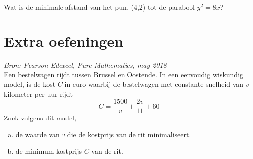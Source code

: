 \documentclass[a4paper,12pt,twoside]{article}
\begin{document}
\begin{oefening}
  Wat is de minimale afstand van het punt (4,2) tot de parabool $y^2 = 8x$?
\end{oefening}


\pagebreak
\section{Extra oefeningen}

\begin{oefening}{\em Bron: Pearson Edexcel, Pure Mathematics, may 2018}\\
  Een bestelwagen rijdt tussen Brussel en Oostende. In een eenvoudig wiskundig model, is de kost $C$ in euro waarbij de bestelwagen met constante snelheid van $v$ kilometer per uur rijdt
  $$ C = \dfrac{1500}{v} + \dfrac{2v}{11} + 60 $$
  Zoek volgens dit model,
  \begin{enumerate}[(a)]
  \item de waarde van $v$ die de kostprijs van de rit minimaliseert,
  \item de minimum kostprijs $C$ van de rit.
  \end{enumerate}
\end{oefening}
\end{document}
